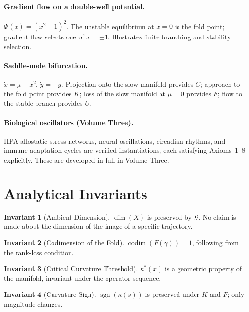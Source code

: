 \documentclass[12pt, oneside]{book}
\theoremstyle{plain}
\theoremstyle{definition}
\newtheorem{invariant}{Invariant}[section]
\theoremstyle{remark}
\begin{document}
\paragraph{Gradient flow on a double-well potential.}
$\Phi(x) = (x^2 - 1)^2$. The unstable equilibrium at $x = 0$ is the
fold point; gradient flow selects one of $x = \pm 1$. Illustrates
finite branching and stability selection.

\paragraph{Saddle-node bifurcation.}
$\dot x = \mu - x^2$, $\dot y = -y$. Projection onto the slow
manifold provides $C$; approach to the fold point provides $K$; loss
of the slow manifold at $\mu = 0$ provides $F$; flow to the stable
branch provides $U$.

\paragraph{Biological oscillators (Volume Three).}
HPA allostatic stress networks, neural oscillations, circadian rhythms,
and immune adaptation cycles are verified instantiations, each satisfying
Axioms~1--8 explicitly. These are developed in full in Volume Three.

\section{Analytical Invariants}

\begin{invariant}[Ambient Dimension]
$\dim(X)$ is preserved by $\mathcal{G}$. No claim is made about the
dimension of the image of a specific trajectory.
\end{invariant}

\begin{invariant}[Codimension of the Fold]
$\operatorname{codim}(F(\gamma)) = 1$, following from the rank-loss
condition.
\end{invariant}

\begin{invariant}[Critical Curvature Threshold]
$\kappa^*(x)$ is a geometric property of the manifold, invariant under
the operator sequence.
\end{invariant}

\begin{invariant}[Curvature Sign]
$\operatorname{sgn}(\kappa(s))$ is preserved under $K$ and $F$; only
magnitude changes.
\end{invariant}
\end{document}
